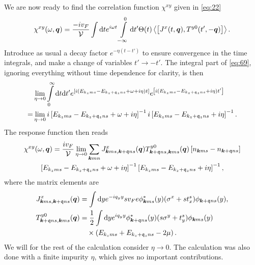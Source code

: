 We are now ready to find the correlation function $\chi ^{xy}$ given in \cref{eq:22}
\begin{equation}
  \label{eq:69}
  \chi ^{xy}(\omega, \vec{q}) =
  \frac{-i v_F}{\mathcal{V}  }
  \int \mathrm{d}t e^{i \omega t} \int\limits_{-\infty }^0 \mathrm{d}t'
  \Theta (t)
  \Braket{\left[
J^x(t, \vec{q}), T^{y 0}(t', -\vec{q})
    \right]}.
\end{equation}
Introduce as usual a decay factor $e^{-\eta (t-t')}$ to ensure convergence in the time integrals, and make a change of variables $t' \to -t'	$.
The integral part of \cref{eq:69}, ignoring everything without time dependence for clarity, is then
\begin{align}
  &\lim_{\eta \to 0}
  \int\limits_{0}^{\infty } \mathrm{d}t \mathrm{d}t'
    e^{\left[ i \left(
        E_{k_z m s} - E_{k_z+\mathfrak{q}_z ns} + \omega   + i \eta
      \right) t \right]}
    e^{\left[ i \left(
        E_{k_z m s} - E_{k_z+\mathfrak{q}_z ns} + i \eta
      \right) t' \right]} \nonumber \\
  =
  &\lim_{\eta \to 0} i \left[ E_{k_zms} - E_{k_z+\mathfrak{q}_z ns} + \omega   + i\eta   \right]^{-1}
i \left[ E_{k_zms} - E_{k_z+\mathfrak{q}_z ns} + i \eta   \right]^{-1}.
\end{align}
The response function then reads
\begin{multline}
  \chi ^{xy}(\omega , \bm{q}) =
  \frac{i v_F  }{\mathcal{V} }
  \lim_{\eta \to 0}
  \sum\limits_{\bm{k}mn}^{}
  J^x_{\bm{k}ms, \bm{k}+\mathfrak{q}ns}(\bm{q})
  T^{y 0}_{\bm{k}+\mathfrak{q}ns, \bm{k}ms}(\bm{q})
  \left[ n_{\bm{k}ms}- n_{\bm{k}+\mathfrak{q} ns} \right] \\
  \left[ E_{k_zms} - E_{k_z+\mathfrak{q}_z ns} + \omega   + i\eta   \right]^{-1}
  \left[ E_{k_zms} - E_{k_z+\mathfrak{q}_z ns} + i \eta   \right]^{-1},
\end{multline}
where the matrix elements are
\begin{align}\label{eq:70}
  J^x_{\bm{k}ms, \bm{k}+\mathfrak{q}ns}(\bm{q}) &= \int \mathrm{d}y
                                                e^{-i q_y y}
                                                 s v_F e\phi ^{*}_{\bm{k}m s}(y)
                                                 (\sigma^x + s t^s_x)
                                                \phi _{\bm{k}+\mathfrak{q}n s}(y),\\
\label{eq:9} T^{y 0}_{\bm{k}+\mathfrak{q} n s, \bm{k} m s}(\bm{q}) &= \frac{1}{2}
              \int \mathrm{d}y
              e^{iq_y y}
              \phi ^{*}_{\bm{k}+\mathfrak{q} n s}(y)
              (s\sigma^y + t^s_y )
              \phi _{\bm{k} m s}(y)\\
\nonumber              &\quad \times \left(
              E_{k_zm s} + E_{k_z+\mathfrak{q}_z n s} - 2 \mu
              \right).
\end{align}
We will for the rest of the calculation consider \( \eta \to 0 \).
The calculation was also done with a finite impurity \( \eta \), which gives no important contributions.

